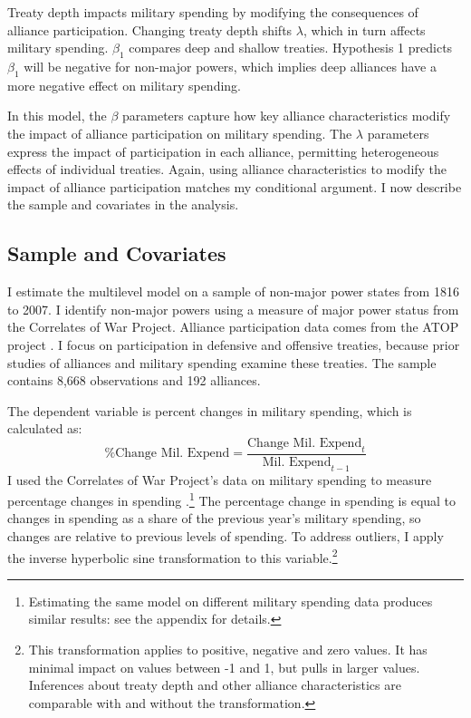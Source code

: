 \documentclass[12pt]{article}
\begin{document}
Treaty depth impacts military spending by modifying the consequences of alliance participation. 
Changing treaty depth shifts $\lambda$, which in turn affects military spending.
$\beta_1$ compares deep and shallow treaties. 
Hypothesis 1 predicts $\beta_1$ will be negative for non-major powers, which implies deep alliances have a more negative effect on military spending. 


In this model, the $\beta$ parameters capture how key alliance characteristics modify the impact of alliance participation on military spending. 
The $\lambda$ parameters express the impact of participation in each alliance, permitting heterogeneous effects of individual treaties. 
Again, using alliance characteristics to modify the impact of alliance participation matches my conditional argument. 
I now describe the sample and covariates in the analysis.  



\subsection{Sample and Covariates} 

I estimate the multilevel model on a sample of non-major power states from 1816 to 2007. 
I identify non-major powers using a measure of major power status from the Correlates of War Project. 
Alliance participation data comes from the ATOP project \citep{Leedsetal2002}.  
I focus on participation in defensive and offensive treaties, because prior studies of alliances and military spending examine these treaties. 
The sample contains 8,668 observations and 192 alliances. 


The dependent variable is percent changes in military spending, which is calculated as:
\begin{equation}
\mbox{\% Change Mil. Expend} = \frac{ \mbox{Change Mil. Expend}_t }{ \mbox{Mil. Expend}_{t-1} }
\end{equation} 
I used the Correlates of War Project's data on military spending to measure percentage changes in spending \citep{SingerCINC1988}.\footnote{Estimating the same model on different military spending data produces similar results: see the appendix for details.} 
The percentage change in spending is equal to changes in spending as a share of the previous year's military spending, so changes are relative to previous levels of spending. 
To address outliers, I apply the inverse hyperbolic sine transformation to this variable.\footnote{This transformation applies to positive, negative and zero values. It has minimal impact on values between -1 and 1, but pulls in larger values. Inferences about treaty depth and other alliance characteristics are comparable with and without the transformation.}
\end{document}
